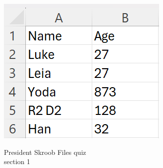 \documentclass{article}
\begin{document}
\begin{enumerate}
		\begin{flushright}
			\includegraphics[scale=.65]{imgs/WritingFamily.PNG}
		\end{flushright}







\end{enumerate}
\pagebreak
President Skroob \hfill Files quiz\\
section 1\\
\end{document}
